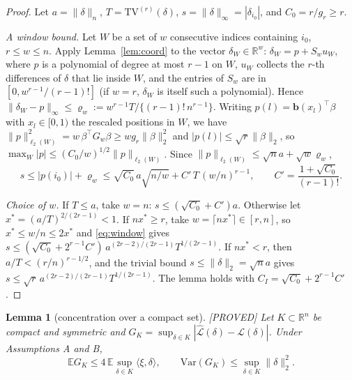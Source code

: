 \documentclass[11pt]{article}
\newtheorem{lemma}{Lemma}
\theoremstyle{definition}
\theoremstyle{remark}
\newcommand{\R}{\mathbb{R}}
\newcommand{\E}{\mathbb{E}}
\newcommand{\TV}{\mathrm{TV}}
\newcommand{\Lh}{\widehat{\mathcal L}}
\newcommand{\Lm}{\mathcal L}
\newcommand{\nn}[1]{\|#1\|_n}
\newcommand{\proved}{\textup{[PROVED]}}
\begin{document}
\begin{proof}
Let $a=\nn{\delta}$, $T=\TV^{(r)}(\delta)$, $s=\|\delta\|_\infty=|\delta_{i_0}|$, and $C_0=r/g_r\ge r$.

\emph{A window bound.} Let $W$ be a set of $w$ consecutive indices containing $i_0$, $r\le w\le n$. Apply Lemma~\ref{lem:coord} to the vector $\delta_W\in\R^w$: $\delta_W=p+S_wu_W$, where $p$ is a polynomial of degree at most $r-1$ on $W$, $u_W$ collects the $r$-th differences of $\delta$ that lie inside $W$, and the entries of $S_w$ are in $[0,w^{r-1}/(r-1)!]$ (if $w=r$, $\delta_W$ is itself such a polynomial). Hence $\|\delta_W-p\|_\infty\le\varrho_w:=w^{r-1}T/\{(r-1)!\,n^{r-1}\}$. Writing $p(l)=\mathbf b(x_l)^\top\beta$ with $x_l\in[0,1)$ the rescaled positions in $W$, we have $\|p\|_{\ell_2(W)}^2=w\,\beta^\top G_w\beta\ge wg_r\|\beta\|_2^2$ and $|p(l)|\le\sqrt r\|\beta\|_2$, so $\max_W|p|\le(C_0/w)^{1/2}\|p\|_{\ell_2(W)}$. Since $\|p\|_{\ell_2(W)}\le\sqrt na+\sqrt w\varrho_w$,
\begin{equation}\label{eq:window}
s\le|p(i_0)|+\varrho_w\le\sqrt{C_0}\,a\sqrt{n/w}+C'\,T\,(w/n)^{r-1},\qquad C'=\frac{1+\sqrt{C_0}}{(r-1)!}.
\end{equation}

\emph{Choice of $w$.} If $T\le a$, take $w=n$: $s\le(\sqrt{C_0}+C')a$. Otherwise let $x^{*}=(a/T)^{2/(2r-1)}<1$. If $nx^{*}\ge r$, take $w=\lceil nx^{*}\rceil\in[r,n]$, so $x^{*}\le w/n\le2x^{*}$ and \eqref{eq:window} gives $s\le(\sqrt{C_0}+2^{r-1}C')\,a^{(2r-2)/(2r-1)}T^{1/(2r-1)}$. If $nx^{*}<r$, then $a/T<(r/n)^{r-1/2}$, and the trivial bound $s\le\|\delta\|_2=\sqrt na$ gives $s\le\sqrt r\,a^{(2r-2)/(2r-1)}T^{1/(2r-1)}$. The lemma holds with $C_I=\sqrt{C_0}+2^{r-1}C'$.
\end{proof}

\begin{lemma}[concentration over a compact set]\label{lem:conc}\proved{}
Let $K\subset\R^n$ be compact and symmetric and $G_K=\sup_{\delta\in K}|\Lh(\delta)-\Lm(\delta)|$. Under Assumptions A and B,
\[
\E G_K\le4\,\E\sup_{\delta\in K}\langle\xi,\delta\rangle,\qquad \mathrm{Var}(G_K)\le\sup_{\delta\in K}\|\delta\|_2^2 .
\]
\end{lemma}
\end{document}
